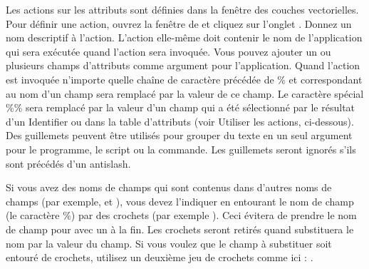 
Les actions sur les attributs sont définies dans la fenêtre  des couches vectorielles. Pour définir une action, ouvrez la 
fenêtre de  et cliquez sur l'onglet . 
Donnez un nom descriptif à l'action. L'action elle-même doit contenir le nom de 
l'application qui sera exécutée quand l'action sera invoquée. Vous pouvez 
ajouter un ou plusieurs champs d'attributs comme argument pour l'application. 
Quand l'action est invoquée n'importe quelle chaîne de caractère précédée de \% 
et correspondant au nom d'un champ sera remplacé par la valeur de ce champ. Le 
caractère spécial \%\% sera remplacé par la valeur d'un champ qui a été 
sélectionné par le résultat d'un Identifier ou dans la table d'attributs (voir 
Utiliser les actions, ci-dessous). Des guillemets peuvent être utilisés pour 
grouper du texte en un seul argument pour le programme, le script ou la 
commande. Les guillemets seront ignorés s'ils sont précédés d'un antislash.

Si vous avez des noms de champs qui sont contenus dans d'autres noms de champs 
(par exemple,  et ), vous devez l'indiquer en 
entourant le nom de champ (le caractère \%) par des crochets (par exemple 
\usertext{[\%col10]}). Ceci évitera de prendre le nom de champ  
pour  avec un  à la fin. Les crochets seront retirés 
quand \qg substituera le nom par la valeur du champ. Si vous voulez que le champ 
à substituer soit entouré de crochets, utilisez un deuxième jeu de crochets 
comme ici : \usertext{[[\%col10]]}.


